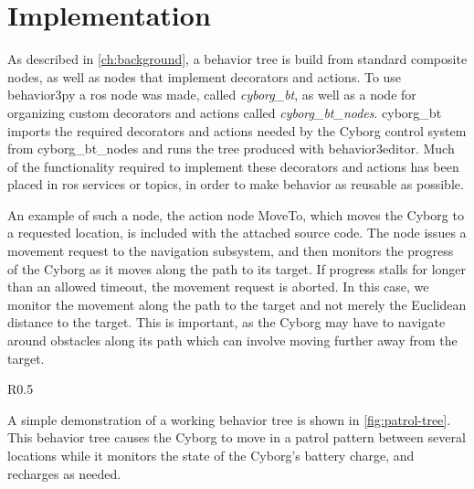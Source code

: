 \documentclass[\rootfolder/main.tex]{subfiles}
\begin{document}

\section{Implementation}

As described in \cref{ch:background}, a behavior tree is build from standard composite nodes, as well as nodes that implement decorators and actions.
To use behavior3py a \acrshort{ros} node was made, called \emph{cyborg\_bt}, as well as a node for organizing custom decorators and actions called \emph{cyborg\_bt\_nodes}.
cyborg\_bt imports the required decorators and actions needed by the Cyborg control system from cyborg\_bt\_nodes and runs the tree produced with behavior3editor.
Much of the functionality required to implement these decorators and actions has been placed in \acrshort{ros} services or topics, in order to make behavior as reusable as possible.

An example of such a node, the action node MoveTo, which moves the Cyborg to a requested location, is included with the attached source code.
The node issues a movement request to the navigation subsystem, and then monitors the progress of the Cyborg as it moves along the path to its target.
If progress stalls for longer than an allowed timeout, the movement request is aborted.
In this case, we monitor the movement along the path to the target and not merely the Euclidean distance to the target.
This is important, as the Cyborg may have to navigate around obstacles along its path which can involve moving further away from the target.

\begin{wrapfigure}{R}{0.5\columnwidth}
    \caption{Behavior tree that checks battery state, and charges if necessary, while patrolling.}
    \label{fig:patrol-tree}
\end{wrapfigure}

A simple demonstration of a working behavior tree is shown in \cref{fig:patrol-tree}.
This behavior tree causes the Cyborg to move in a patrol pattern between several locations while it monitors the state of the Cyborg's battery charge, and recharges as needed.
\end{document}

